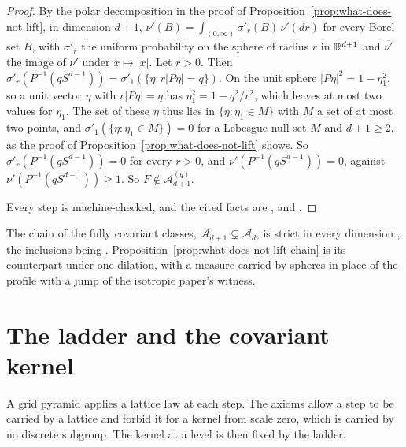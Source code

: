 \begin{proof}
By the polar decomposition in the proof of Proposition~\ref{prop:what-does-not-lift}, in dimension
$d + 1$, $\nu'(B) = \int_{(0,\infty)}\sigma'_r(B)\,\overline{\nu'}(dr)$ for every Borel set $B$, with
$\sigma'_r$ the uniform probability on the sphere of radius $r$ in $\mathbb{R}^{d+1}$ and $\overline{\nu'}$
the image of $\nu'$ under $x \mapsto |x|$. Let $r > 0$. Then
$\sigma'_r(P^{-1}(qS^{d-1})) = \sigma'_1(\{\eta : r|P\eta| = q\})$. On the unit sphere
$|P\eta|^2 = 1 - \eta_1^2$, so a unit vector $\eta$ with $r|P\eta| = q$ has
$\eta_1^2 = 1 - q^2/r^2$, which leaves at most two values for $\eta_1$. The set of these $\eta$ thus
lies in $\{\eta : \eta_1 \in M\}$ with $M$ a set of at most two points, and
$\sigma'_1(\{\eta : \eta_1 \in M\}) = 0$ for a Lebesgue-null set $M$ and $d + 1 \ge 2$, as the proof
of Proposition~\ref{prop:what-does-not-lift} shows. So $\sigma'_r(P^{-1}(qS^{d-1})) = 0$ for every
$r > 0$, and $\nu'(P^{-1}(qS^{d-1})) = 0$, against $\nu'(P^{-1}(qS^{d-1})) \ge 1$. So
$F \notin \mathcal{A}^{(q)}_{d+1}$.

Every step is machine-checked, and the cited facts are ,  and .
\end{proof}

The chain of the fully covariant classes, $\mathcal{A}_{d+1} \subsetneq \mathcal{A}_d$, is strict in
every dimension , the inclusions being
. Proposition~\ref{prop:what-does-not-lift-chain} is its counterpart
under one dilation, with a \Levy{} measure carried by spheres in place of the profile with a jump of
the isotropic paper's witness.

\section{The ladder and the covariant kernel}
\label{sec:pyramid-ladder}

A grid pyramid applies a lattice law at each step. The axioms allow a step to be carried by a
lattice and forbid it for a kernel from scale zero, which is carried by no discrete subgroup. The kernel at a
level is then fixed by the ladder.

